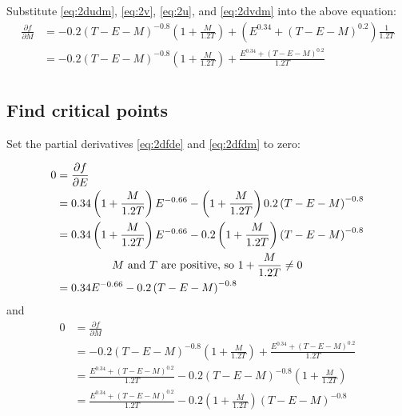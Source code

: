 \documentclass{article}
\begin{document}
Substitute \eqref{eq:2dudm}, \eqref{eq:2v}, \eqref{eq:2u}, and \eqref{eq:2dvdm} into the above equation:
\begin{equation}\label{eq:2dfdm}
  \begin{split}
    \frac{\partial f}{\partial M} & = - 0.2\left( T - E - M \right)^{-0.8}\left( 1 + \frac{M}{1.2 T} \right) + \left( E^{0.34} + \left( T - E - M \right)^{0.2} \right)\frac{1}{1.2 T} \\
    & = - 0.2\left( T - E - M \right)^{-0.8}\left( 1 + \frac{M}{1.2 T} \right) + \frac{E^{0.34} + \left( T - E - M \right)^{0.2}}{1.2 T} \\
  \end{split}
\end{equation}

\subsection{Find critical points}

Set the partial derivatives \eqref{eq:2dfde} and \eqref{eq:2dfdm} to zero:

\begin{equation}\label{eq:2dfde0}
  \begin{split}
    0 & = \frac{\partial f}{\partial E} \\
    & = 0.34\left( 1 + \frac{M}{1.2 T} \right)E^{-0.66} - \left( 1 + \frac{M}{1.2 T} \right)0.2\left( T - E - M \right)^{-0.8} \\
    & = 0.34\left( 1 + \frac{M}{1.2 T} \right)E^{-0.66} - 0.2\left( 1 + \frac{M}{1.2 T} \right)\left( T - E - M \right)^{-0.8} \\
    \span \text{$M$ and $T$ are positive, so $1 + \frac{M}{1.2T} \ne 0$} \\
    & = 0.34E^{-0.66} - 0.2\left( T - E - M \right)^{-0.8} \\
  \end{split}
\end{equation}
and
\begin{equation}\label{eq:2dfdm0}
  \begin{split}
    0 & = \frac{\partial f}{\partial M} \\
    & = - 0.2\left( T - E - M \right)^{-0.8}\left( 1 + \frac{M}{1.2 T} \right) + \frac{E^{0.34} + \left( T - E - M \right)^{0.2}}{1.2 T} \\
    & = \frac{E^{0.34} + \left( T - E - M \right)^{0.2}}{1.2 T} - 0.2\left( T - E - M \right)^{-0.8}\left( 1 + \frac{M}{1.2 T} \right) \\
    & = \frac{E^{0.34} + \left( T - E - M \right)^{0.2}}{1.2 T} - 0.2\left( 1 + \frac{M}{1.2 T} \right)\left( T - E - M \right)^{-0.8} \\
  \end{split}
\end{equation}
\end{document}
